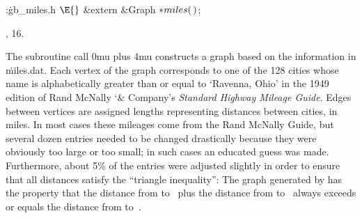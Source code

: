 \Y\B\4:\.{gb\_miles.h }\X${}\E{}$\6
\&{extern} \&{Graph} ${}{*}\\{miles}(\,){}$;\par
{}, 16.\fi

The subroutine call {\advance\thinmuskip 0mu plus 4mu
}
constructs a graph based on the information in \.{miles.dat}.
Each vertex of the graph corresponds to one of the 128 cities whose
name is alphabetically greater than or equal to `Ravenna, Ohio' in
the 1949 edition of Rand McNally {\char`\&} Company's {\sl Standard Highway
Mileage Guide}. Edges between vertices are assigned lengths representing
distances between cities, in miles. In most cases these mileages come
from the Rand McNally Guide, but several dozen entries needed to be changed
drastically because they were obviously too large or too small; in such cases
an educated guess was made. Furthermore, about 5\% of the entries were
adjusted slightly in order to
ensure that all distances satisfy the ``triangle inequality'': The
graph generated by  has the property that the
distance from  to~ plus the distance from  to~
always exceeds
or equals the distance from  to~.

